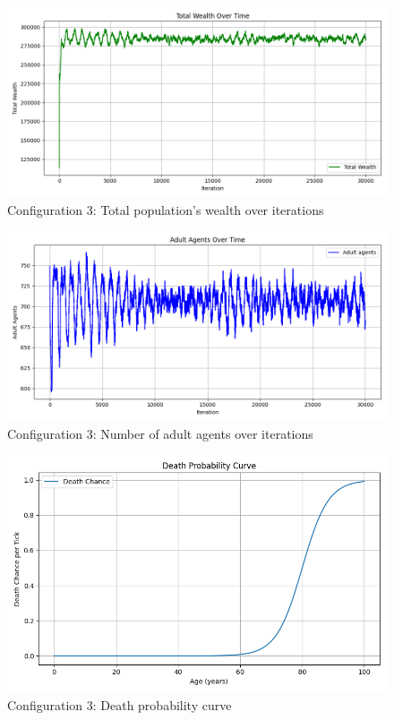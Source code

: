 \documentclass[english]{projectreport}
\begin{document}
    \begin{figure}[H]
        \centering
        \includegraphics[width=0.8\linewidth]{metrics_config3/metrics_config3_total_wealth.png}
        \caption{Configuration 3: Total population's wealth over iterations}
        \label{fig:c0-total_wealth}
    \end{figure}

    \begin{figure}[H]
        \centering
        \includegraphics[width=0.8\linewidth]{metrics_config3/metrics_config3_adult_agents.png}
        \caption{Configuration 3: Number of adult agents over iterations}
        \label{fig:c0-adult_agents}
    \end{figure}

    \begin{figure}[H]
        \centering
        \includegraphics[width=0.8\linewidth]{metrics_config3/metrics_config3_death_probability_curve.png}
        \caption{Configuration 3: Death probability curve}
        \label{fig:c0-death_probability_curve}
    \end{figure}
\end{document}
